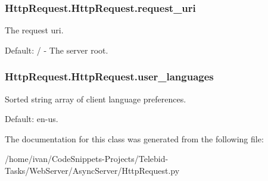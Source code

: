 \hypertarget{class_http_request_1_1_http_request_a9bd2a9b2ee31facca4d929b380028082}{
\subsubsection[{request\-\_\-uri}]{\setlength{\rightskip}{0pt plus 5cm}Http\-Request.\-Http\-Request.\-request\-\_\-uri}}\label{class_http_request_1_1_http_request_a9bd2a9b2ee31facca4d929b380028082}


The request uri. 

Default\-: / -\/ The server root. \hypertarget{class_http_request_1_1_http_request_ad8cd9706417efafced52baca81c03855}{
\subsubsection[{user\-\_\-languages}]{\setlength{\rightskip}{0pt plus 5cm}Http\-Request.\-Http\-Request.\-user\-\_\-languages}}\label{class_http_request_1_1_http_request_ad8cd9706417efafced52baca81c03855}


Sorted string array of client language preferences. 

Default\-: en-\/us. 

The documentation for this class was generated from the following file\-:\begin{DoxyCompactItemize}
\item 
/home/ivan/\-Code\-Snippets-\/\-Projects/\-Telebid-\/\-Tasks/\-Web\-Server/\-Async\-Server/Http\-Request.\-py\end{DoxyCompactItemize}
